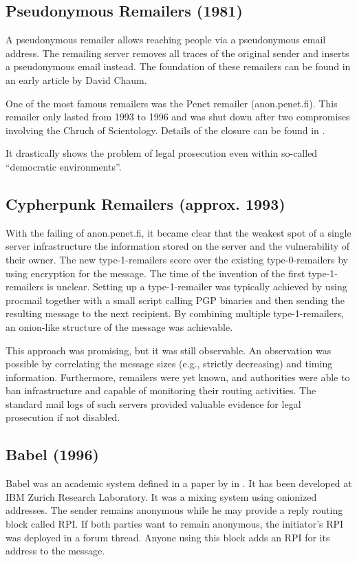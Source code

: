 \subsection{Pseudonymous Remailers (1981)\label{sec:remPseudo}}
A pseudonymous remailer allows reaching people via a pseudonymous email address. The remailing server removes all traces of the original sender and inserts a pseudonymous email instead. The foundation of these remailers can be found in an early article by David Chaum\cite{CHAUM1}.

One of the most famous remailers was the Penet remailer (anon.penet.fi). This remailer only lasted from 1993 to 1996 and was shut down after two compromises involving the Chruch of Scientology. Details of the closure can be found in \cite{penetClosure}.

It drastically shows the problem of legal prosecution even within so-called ``democratic environments''.

\subsection{Cypherpunk Remailers (approx. 1993)\label{sec:remCypherpunk}}
With the failing of anon.penet.fi, it became clear that the weakest spot of a single server infrastructure the information stored on the server and the vulnerability of their owner. The new type-1-remailers score over the existing type-0-remailers by using encryption for the message.  The time of the invention of the first type-1-remailers is unclear. Setting up a type-1-remailer was typically achieved by using procmail together with a small script calling PGP binaries and then sending the resulting message to the next recipient. By combining multiple type-1-remailers, an onion-like structure of the message was achievable. 

This approach was promising, but it was still observable. An observation was possible by correlating the message sizes (e.g., strictly decreasing) and timing information. Furthermore, remailers were yet known, and authorities were able to ban infrastructure and capable of monitoring their routing activities. The standard mail logs of such servers provided valuable evidence for legal prosecution if not disabled.

\subsection{Babel (1996)}
Babel was an academic system defined in a paper by \citeauthor{babel} in \citeyear{babel}\cite{babel}. It has been developed at IBM Zurich Research Laboratory. It was a mixing system using onionized addresses. The sender remains anonymous while he may provide a reply routing block called RPI. If both parties want to remain anonymous, the initiator's RPI was deployed in a forum thread. Anyone using this block adds an RPI for its address to the message.

